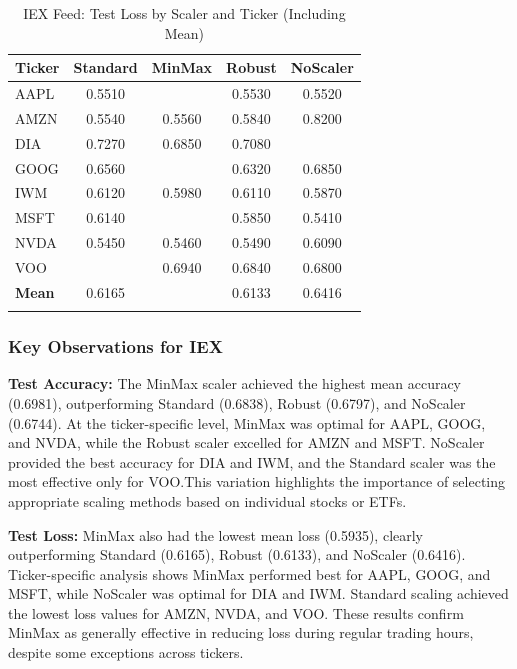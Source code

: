 \documentclass[10pt,a4paper]{article}
\begin{document}
\begin{table}[H]
\centering
{}
\caption{IEX Feed: Test Loss by Scaler and Ticker (Including Mean)}
\begin{tabular}{lcccc}
\toprule
\textbf{Ticker} & \textbf{Standard} & \textbf{MinMax} & \textbf{Robust} & \textbf{NoScaler} \\
\midrule
AAPL  & 0.5510 & \cellcolor{lightblue}{0.5430} & 0.5530 & 0.5520 \\
AMZN  & \cellcolor{lightblue}0.5540 & 0.5560 & 0.5840 & 0.8200 \\
DIA   & 0.7270 & 0.6850 & 0.7080 & \cellcolor{lightblue}{0.6590} \\
GOOG  & 0.6560 & \cellcolor{lightblue}{0.5900} & 0.6320 & 0.6850 \\
IWM   & 0.6120 & 0.5980 & 0.6110 &\cellcolor{lightblue} 0.5870 \\
MSFT  & 0.6140 & \cellcolor{lightblue}{0.5360} & 0.5850 & 0.5410 \\
NVDA  & \cellcolor{lightblue}0.5450 & 0.5460 & 0.5490 & 0.6090 \\
VOO   & \cellcolor{lightblue}{0.6730} & 0.6940 & 0.6840 & 0.6800 \\
\midrule
\textbf{Mean} & 0.6165 & \cellcolor{lightblue}{0.5935} & 0.6133 & 0.6416 \\
\bottomrule
\label{tab:iex_loss}
\end{tabular}
\end{table}

\subsubsection*{Key Observations for IEX}

\textbf{Test Accuracy:} The MinMax scaler achieved the highest mean accuracy (0.6981), outperforming Standard (0.6838), Robust (0.6797), and NoScaler (0.6744). At the ticker-specific level, MinMax was optimal for AAPL, GOOG, and NVDA, while the Robust scaler excelled for AMZN and MSFT. NoScaler provided the best accuracy for DIA and IWM, and the Standard scaler was the most effective only for VOO.This variation highlights the importance of selecting appropriate scaling methods based on individual stocks or ETFs.

\textbf{Test Loss:} MinMax also had the lowest mean loss (0.5935), clearly outperforming Standard (0.6165), Robust (0.6133), and NoScaler (0.6416). Ticker-specific analysis shows MinMax performed best for AAPL, GOOG, and MSFT, while NoScaler was optimal for DIA and IWM. Standard scaling achieved the lowest loss values for AMZN, NVDA, and VOO. These results confirm MinMax as generally effective in reducing loss during regular trading hours, despite some exceptions across tickers.
\end{document}
